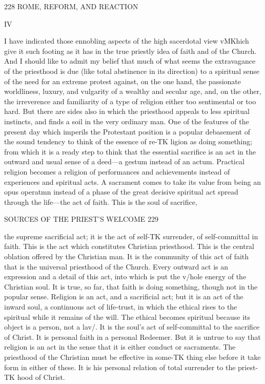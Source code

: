 \documentclass[12pt,a5paper,twoside]{book}
\begin{document}
{{228 ROME, REFORM, AND REACTION 

IV 

I have indicated those ennobling aspects of the high 
sacerdotal view vMKhich give it such footing as it has in 
the true priestly idea of faith and of the Church. 
And I should like to admit my belief that much of 
what seems the extravagance of the priesthood is due 
(like total abstinence in its direction) to a spiritual 
sense of the need for an extreme protest against, on 
the one hand, the passionate worldliness, luxury, and 
vulgarity of a wealthy and secular age, and, on the 
other, the irreverence and familiarity of a type of 
religion either too sentimental or too hard. But there 
are sides also in which the priesthood appeals to less 
spiritual instincts, and finds a soil in the very ordinary 
man. One of the features of the present day which 
imperils the Protestant position is a popular debasement 
of the sound tendency to think of the essence of re-TK
ligion as doing something; from which it is a ready 
step to think that the essential sacrifice is an act in the 
outward and usual sense of a deed---a gestum instead 
of an actum. Practical religion becomes a religion of 
performances and achievements instead of experiences 
and spiritual acts. A sacrament comes to take its 
value from being an opus operatmn instead of a phase 
of the great decisive spiritual act spread through the 
life---the act of faith. This is the soul of sacrifice, 



SOURCES OF THE PRIEST'S WELCOME 229 

the supreme sacrificial act; it is the act of self-TK
surrender, of self-committal in faith. This is the act 
which constitutes Christian priesthood. This is the 
central oblation offered by the Christian man. It is 
the community of this act of faith that is the universal 
priesthood of the Church. Every outward act is an 
expression and a detail of this act, into which is put 
the v/hole energy of the Christian soul. It is true, so 
far, that faith is doing something, though not in the 
popular sense. Religion is an act, and a sacrificial act; 
but it is an act of the inward soul, a continuous act 
of life-trust, in which the ethical rises to the spiritual 
while it remains of the will. The ethical becomes 
spiritual because its object is a person, not a lav/. It 
is the soul's act of self-committal to the sacrifice of 
Christ. It is personal faith in a personal Redeemer. 
But it is untrue to say that religion is an act in the 
sense that it is either conduct or sacraments. The 
priesthood of the Christian must be effective in some-TK
thing else before it take form in either of these. It is 
his personal relation of total surrender to the priest-TK
hood of Christ. 

}}
\end{document}
